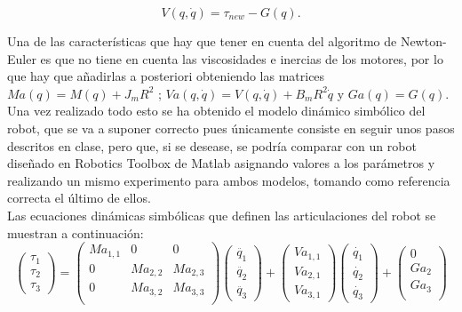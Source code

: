 \begin{equation}
V(q,\dot{q})=\tau_{new}-G(q).
\end{equation}

Una de las características que hay que tener en cuenta del algoritmo de Newton-Euler es que no tiene en cuenta las viscosidades e inercias de los motores, por lo que hay que añadirlas a posteriori obteniendo las matrices $Ma(q)=M(q)+J_mR^2$ ; $Va(q,\dot{q})=V(q,\dot{q})+B_mR^2\dot{q}$ y $Ga(q)=G(q)$.\\

Una vez realizado todo esto se ha obtenido el modelo dinámico simbólico del robot, que se va a suponer correcto pues únicamente consiste en seguir unos pasos descritos en clase, pero que, si se desease, se podría comparar con un robot diseñado en Robotics Toolbox de Matlab asignando valores a los parámetros y realizando un mismo experimento para ambos modelos, tomando como referencia correcta el último de ellos.\\

Las ecuaciones dinámicas simbólicas que definen las articulaciones del robot se muestran a continuación: \\
\[
	\begin{pmatrix}
	\tau_{1} \\
	\tau_{2} \\
	\tau_{3}
	\end{pmatrix} =
	\begin{pmatrix}
		Ma_{1,1} & 0 & 0\\
		0 & Ma_{2,2} & Ma_{2,3}\\
		0 & Ma_{3,2} & Ma_{3,3}\\
	\end{pmatrix}
	\begin{pmatrix}
	\ddot{q_{1}} \\
	\ddot{q_{2}}  \\
	\ddot{q_{3}}
\end{pmatrix} +
\begin{pmatrix}
	Va_{1,1}\\
	Va_{2,1} \\
  Va_{3,1}
\end{pmatrix}
\begin{pmatrix}
		\dot{q_{1}} \\
		\dot{q_{2}}  \\
		\dot{q_{3}}
\end{pmatrix} +
\begin{pmatrix}
	0\\
	Ga_{2}\\
	Ga_{3}\\
\end{pmatrix}
\]


